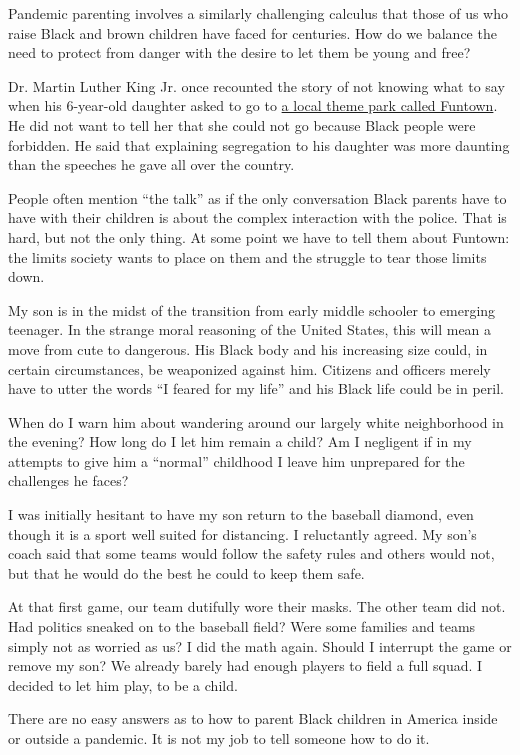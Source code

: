 Pandemic parenting involves a similarly challenging calculus that those
of us who raise Black and brown children have faced for centuries. How
do we balance the need to protect from danger with the desire to let
them be young and free?

Dr. Martin Luther King Jr. once recounted the story of not knowing what
to say when his 6-year-old daughter asked to go to
\href{https://www.africa.upenn.edu/Articles_Gen/Letter_Birmingham.html}{a
local theme park called Funtown}. He did not want to tell her that she
could not go because Black people were forbidden. He said that
explaining segregation to his daughter was more daunting than the
speeches he gave all over the country.

People often mention ``the talk'' as if the only conversation Black
parents have to have with their children is about the complex
interaction with the police. That is hard, but not the only thing. At
some point we have to tell them about Funtown: the limits society wants
to place on them and the struggle to tear those limits down.

My son is in the midst of the transition from early middle schooler to
emerging teenager. In the strange moral reasoning of the United States,
this will mean a move from cute to dangerous. His Black body and his
increasing size could, in certain circumstances, be weaponized against
him. Citizens and officers merely have to utter the words ``I feared for
my life'' and his Black life could be in peril.

When do I warn him about wandering around our largely white neighborhood
in the evening? How long do I let him remain a child? Am I negligent if
in my attempts to give him a ``normal'' childhood I leave him unprepared
for the challenges he faces?

I was initially hesitant to have my son return to the baseball diamond,
even though it is a sport well suited for distancing. I reluctantly
agreed. My son's coach said that some teams would follow the safety
rules and others would not, but that he would do the best he could to
keep them safe.

At that first game, our team dutifully wore their masks. The other team
did not. Had politics sneaked on to the baseball field? Were some
families and teams simply not as worried as us? I did the math again.
Should I interrupt the game or remove my son? We already barely had
enough players to field a full squad. I decided to let him play, to be a
child.

There are no easy answers as to how to parent Black children in America
inside or outside a pandemic. It is not my job to tell someone how to do
it.

